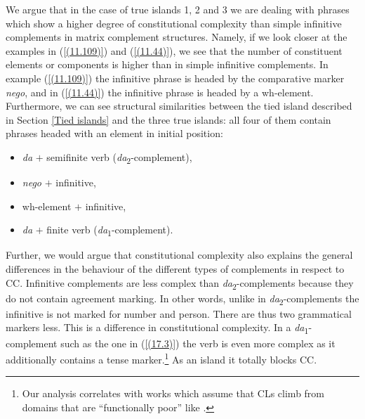 We argue that in the case of true islands 1, 2 and 3 we are dealing with phrases which show a higher degree of constitutional complexity than simple infinitive complements in matrix complement structures. Namely, if we look closer at the examples in (\ref{(11.109)}) and (\ref{(11.44)}), we see that the number of constituent elements or components is higher than in simple infinitive complements. In example (\ref{(11.109)}) the infinitive phrase is headed by the comparative marker \textit{nego}, and in (\ref{(11.44)}) the infinitive phrase is headed by a wh-element. Furthermore, we can see structural similarities between the tied island described in Section \ref{Tied islands} and the three true islands: all four of them contain phrases headed with an element in initial position:

\begin{itemize}
\item \textit{da} $+$ semifinite verb (\textit{da}\textsubscript{2}-complement),
\item \textit{nego} $+$ infinitive,
\item wh-element $+$ infinitive,
\item \textit{da} $+$ finite verb (\textit{da}\textsubscript{1}-complement).
\end{itemize}

Further, we would argue that constitutional complexity also explains the general differences in the behaviour of the different types of complements in respect to CC. Infinitive complements are less complex than \textit{da}\textsubscript{2}-complements because they do not contain agreement marking. In other words, unlike in \textit{da}\textsubscript{2}-complements the infinitive is not marked for number and person. There are thus two grammatical markers less. This is a difference in constitutional complexity. In a \textit{da}\textsubscript{1}-complement such as the one in (\ref{(17.3)}) the verb is even more complex as it additionally contains a tense marker.\footnote{Our analysis correlates with works which assume that CLs climb from domains that are “functionally poor” like \citet[][]{Aljovic05}.} As an island it totally blocks CC.

